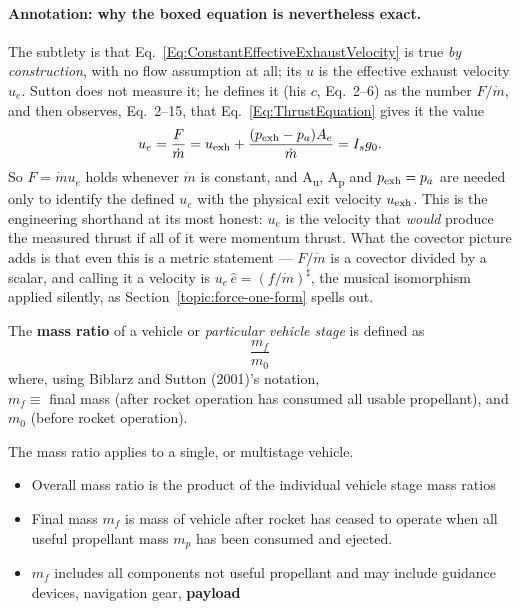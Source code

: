 \paragraph*{Annotation: why the boxed equation is nevertheless exact.}
The subtlety is that Eq.~\ref{Eq:ConstantEffectiveExhaustVelocity} is true
\emph{by construction}, with no flow assumption at all; its $u$ is the
effective exhaust velocity $u_e$. Sutton does not measure it; he defines it
(his $c$, Eq.~2--6) as the number $F/\dot m$, and then observes, Eq.~2--15,
that Eq.~\ref{Eq:ThrustEquation} gives it the value
\[
 u_e=\frac{F}{\dot m}=u_{\rm exh}+\frac{(p_{\rm exh}-p_a)A_e}{\dot m}=I_sg_0 .
\]
So $F=\dot mu_e$ holds whenever $\dot m$ is constant, and
A\textsubscript{u}, A\textsubscript{p} and $p_{\rm exh}=p_a$ are needed only
to identify the defined $u_e$ with the physical exit velocity $u_{\rm exh}$.
This is the engineering shorthand at its most honest: $u_e$ is the velocity
that
\emph{would} produce the measured thrust if all of it were momentum thrust.
What the covector picture adds is that even this is a metric statement ---
$F/\dot m$ is a covector divided by a scalar, and calling it a velocity is
$u_e\,\hat e=(f/\dot m)^\sharp$, the musical isomorphism applied silently, as
Section~\ref{topic:force-one-form} spells out.

The \textbf{mass ratio} of a vehicle or \emph{particular vehicle
stage} is defined as
\[
\frac{m_f}{m_0}
\]
where, using Biblarz and Sutton (2001)'s notation, \\
$m_f \equiv $ final mass (after rocket operation has consumed all usable
propellant), and \\
$m_0$ (before rocket operation).

The mass ratio applies to a single, or multistage vehicle.
\begin{itemize}
	\item Overall mass ratio is the product of the individual vehicle stage
	mass ratios
	\item Final mass $m_f$ is mass of vehicle after rocket has ceased to
	operate when all useful propellant mass $m_p$ has been consumed and
	ejected.
	\item $m_f$ includes all components not useful propellant and may include
	guidance devices, navigation gear, \textbf{payload}
	\end{itemize}

